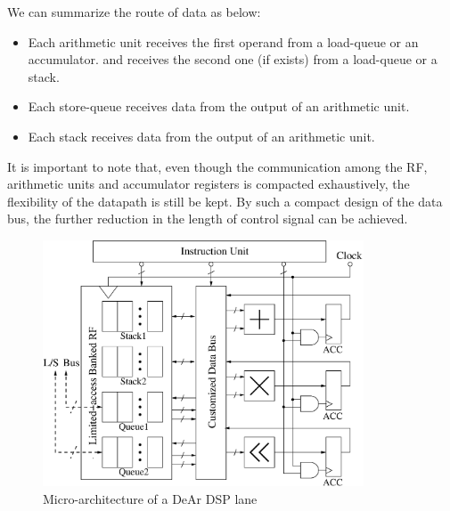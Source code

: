         We can summarize the route of data as below:
        \begin{itemize}
            \item Each arithmetic unit receives the first operand from a load-queue or an accumulator.
        and receives the second one (if exists) from a load-queue or a stack.
            \item Each store-queue receives data from the output of an arithmetic unit.
            \item Each stack receives data from the output of an arithmetic unit.
        \end{itemize}
        It is important to note that, even though the communication among the RF, arithmetic units and accumulator registers is compacted exhaustively, 
        the flexibility of the datapath is still be kept.
        By such a compact design of the data bus, the further reduction in the length of control signal can be achieved.
        \vspace{\textfig}
        \begin{figure}[!ht] 
            \centering
            \includegraphics[width=0.85\textwidth]{./figs/micro.eps}
            \caption{Micro-architecture of a DeAr DSP lane}
            \label{fig:micro}
        \end{figure}

